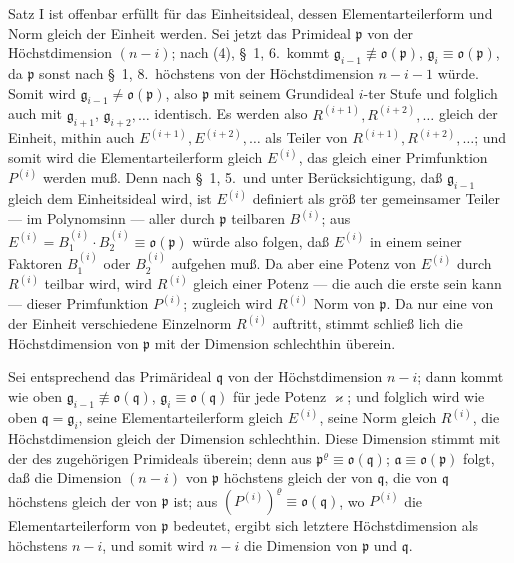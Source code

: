 \documentclass[12pt,a4paper]{article}
\begin{document}
{Satz I ist offenbar erf\"{u}llt f\"{u}r das Einheitsideal, dessen Elementarteilerform
und Norm gleich der Einheit werden. Sei jetzt das Primideal $\mathfrak{p}$
von der H\"{o}chstdimension $(n-i)$; nach (4), \S~1, 6.\ kommt
$\mathfrak{g}_{i-1}\not\equiv\mathfrak{o}(\mathfrak{p})$, $\mathfrak{g}_{i}\equiv\mathfrak{o}(\mathfrak{p})$,
da $\mathfrak{p}$ sonst nach \S~1, 8.\ h\"{o}chstens von der H\"{o}chstdimension $n-i-1$
w\"{u}rde. Somit wird $\mathfrak{g}_{i-1}\neq\mathfrak{o}(\mathfrak{p})$, also $\mathfrak{p}$ mit seinem Grundideal $i$-ter Stufe
und folglich auch mit $\mathfrak{g}_{i+1}$, $\mathfrak{g}_{i+2},\dots$ identisch. Es werden also
$R^{(i+1)},R^{(i+2)},\dots$ gleich der Einheit, mithin auch $E^{(i+1)},E^{(i+2)},\dots$
als Teiler von $R^{(i+1)},R^{(i+2)},\dots$; und somit wird die Elementarteilerform
gleich $E^{(i)}$, das gleich einer Primfunktion $P^{(i)}$ werden mu{\ss}. Denn nach
\S~1, 5.\ und unter Ber\"{u}cksichtigung, da{\ss} $\mathfrak{g}_{i-1}$ gleich dem Einheitsideal
wird, ist $E^{(i)}$ definiert als gr\"{o}{\ss} ter gemeinsamer Teiler --- im Polynomsinn
--- aller durch $\mathfrak{p}$ teilbaren $B^{(i)}$; aus $E^{(i)}=B_{1}^{(i)}\cdot B_{2}^{(i)}\equiv\mathfrak{o}(\mathfrak{p})$
w\"{u}rde also folgen, da{\ss} $E^{(i)}$ in einem seiner Faktoren $B_{1}^{(i)}$ oder $B_{2}^{(i)}$
aufgehen mu{\ss}. Da aber eine Potenz von $E^{(i)}$ durch $R^{(i)}$ teilbar wird,
wird $R^{(i)}$ gleich einer Potenz --- die auch die erste sein kann --- dieser
Primfunktion $P^{(i)}$; zugleich wird $R^{(i)}$ Norm von $\mathfrak{p}$. Da nur eine von
der Einheit verschiedene Einzelnorm $R^{(i)}$ auftritt, stimmt schlie{\ss} lich
die H\"{o}chstdimension von $\mathfrak{p}$ mit der Dimension schlechthin \"{u}berein.

Sei entsprechend das Prim\"{a}rideal $\mathfrak{q}$ von der H\"{o}chstdimension $n-i$;
dann kommt wie oben $\mathfrak{g}_{i-1}\not\equiv\mathfrak{o}(\mathfrak{q})$, $\mathfrak{g}_{i}\equiv\mathfrak{o}(\mathfrak{q})$
f\"{u}r jede Potenz $\varkappa$; und folglich wird wie oben $\mathfrak{q}=\mathfrak{g}_{i}$, seine Elementarteilerform
gleich $E^{(i)}$, seine Norm gleich $R^{(i)}$, die H\"{o}chstdimension gleich
der Dimension schlechthin. Diese Dimension stimmt mit der des zugeh\"{o}rigen
Primideals \"{u}berein; denn aus $\mathfrak{p}^{\varrho}\equiv\mathfrak{o}(\mathfrak{q})$; $\mathfrak{a}\equiv\mathfrak{o}(\mathfrak{p})$ folgt, da{\ss{}}
die Dimension $(n-i)$ von $\mathfrak{p}$ h\"{o}chstens gleich der von $\mathfrak{q}$, die von $\mathfrak{q}$ h\"{o}chstens
gleich der von $\mathfrak{p}$ ist; aus $(P^{(i)})^{\varrho}\equiv\mathfrak{o}(\mathfrak{q})$, wo $P^{(i)}$ die Elementarteilerform
von $\mathfrak{p}$ bedeutet, ergibt sich letztere H\"{o}chstdimension als h\"{o}chstens
$n-i$, und somit wird $n-i$ die Dimension von $\mathfrak{p}$ und $\mathfrak{q}$.

}
\end{document}
